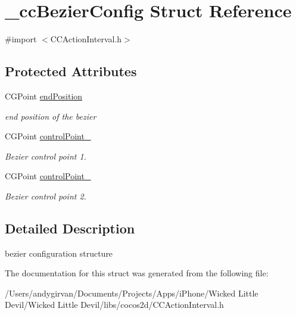 \hypertarget{struct__cc_bezier_config}{\section{\-\_\-cc\-Bezier\-Config Struct Reference}
\label{struct__cc_bezier_config}
}


{\ttfamily \#import $<$C\-C\-Action\-Interval.\-h$>$}

\subsection*{Protected Attributes}
\begin{DoxyCompactItemize}
\item 
\hypertarget{struct__cc_bezier_config_a2bd61c0bb31be66157fc3081d6934645}{C\-G\-Point \hyperlink{struct__cc_bezier_config_a2bd61c0bb31be66157fc3081d6934645}{end\-Position}}\label{struct__cc_bezier_config_a2bd61c0bb31be66157fc3081d6934645}

\begin{DoxyCompactList}\small\item\em end position of the bezier \end{DoxyCompactList}\item 
\hypertarget{struct__cc_bezier_config_ac21875ed3c5bca510dbe37f96ef61bc7}{C\-G\-Point \hyperlink{struct__cc_bezier_config_ac21875ed3c5bca510dbe37f96ef61bc7}{control\-Point\-\_}}\label{struct__cc_bezier_config_ac21875ed3c5bca510dbe37f96ef61bc7}

\begin{DoxyCompactList}\small\item\em Bezier control point 1. \end{DoxyCompactList}\item 
\hypertarget{struct__cc_bezier_config_a0b528a7bf60a66f7094d4d139d895856}{C\-G\-Point \hyperlink{struct__cc_bezier_config_a0b528a7bf60a66f7094d4d139d895856}{control\-Point\-\_}}\label{struct__cc_bezier_config_a0b528a7bf60a66f7094d4d139d895856}

\begin{DoxyCompactList}\small\item\em Bezier control point 2. \end{DoxyCompactList}\end{DoxyCompactItemize}


\subsection{Detailed Description}
bezier configuration structure 

The documentation for this struct was generated from the following file\-:\begin{DoxyCompactItemize}
\item 
/\-Users/andygirvan/\-Documents/\-Projects/\-Apps/i\-Phone/\-Wicked Little Devil/\-Wicked Little Devil/libs/cocos2d/C\-C\-Action\-Interval.\-h\end{DoxyCompactItemize}
